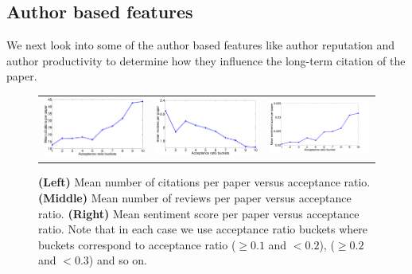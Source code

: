 \noindent
\subsection{Author based features}
\label{author_analysis}

We next look into some of the author based features like author reputation and author productivity to determine how they influence the long-term citation of the paper.  
\begin{figure}
\centering
\begin{tabular}{ccc}
\includegraphics[scale=0.15]{figures/citation_succes_ratio.eps} & \includegraphics[scale=0.15]{figures/review_succes_ratio.eps} & \includegraphics[scale=0.15]{figures/sentiment_succes_ratio-eps-converted-to.pdf}
\end{tabular}
\caption{{\bf (Left)} Mean number of citations per paper versus acceptance ratio. {\bf (Middle)} Mean number of reviews per paper versus acceptance ratio. {\bf (Right)} Mean sentiment score per paper versus acceptance ratio. Note that in each case we use acceptance ratio buckets where buckets correspond to acceptance ratio ($\geq 0.1$ and $< 0.2$), ($\geq 0.2$ and $<0.3$) and so on.}
\label{fig13}
\end{figure}
